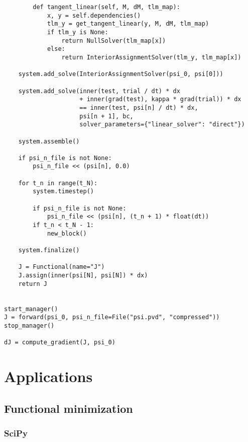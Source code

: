 \documentclass[11pt]{article}
\begin{document}
\begin{lstlisting}
        def tangent_linear(self, M, dM, tlm_map):
            x, y = self.dependencies()
            tlm_y = get_tangent_linear(y, M, dM, tlm_map)
            if tlm_y is None:
                return NullSolver(tlm_map[x])
            else:
                return InteriorAssignmentSolver(tlm_y, tlm_map[x])

    system.add_solve(InteriorAssignmentSolver(psi_0, psi[0]))

    system.add_solve(inner(test, trial / dt) * dx
                     + inner(grad(test), kappa * grad(trial)) * dx
                     == inner(test, psi[n] / dt) * dx,
                     psi[n + 1], bc,
                     solver_parameters={"linear_solver": "direct"})

    system.assemble()

    if psi_n_file is not None:
        psi_n_file << (psi[n], 0.0)

    for t_n in range(t_N):
        system.timestep()

        if psi_n_file is not None:
            psi_n_file << (psi[n], (t_n + 1) * float(dt))
        if t_n < t_N - 1:
            new_block()

    system.finalize()

    J = Functional(name="J")
    J.assign(inner(psi[N], psi[N]) * dx)
    return J


start_manager()
J = forward(psi_0, psi_n_file=File("psi.pvd", "compressed"))
stop_manager()

dJ = compute_gradient(J, psi_0)
\end{lstlisting}

\section{Applications}

\subsection{Functional minimization}\label{sect:minimization}

\subsubsection{SciPy}
\end{document}

